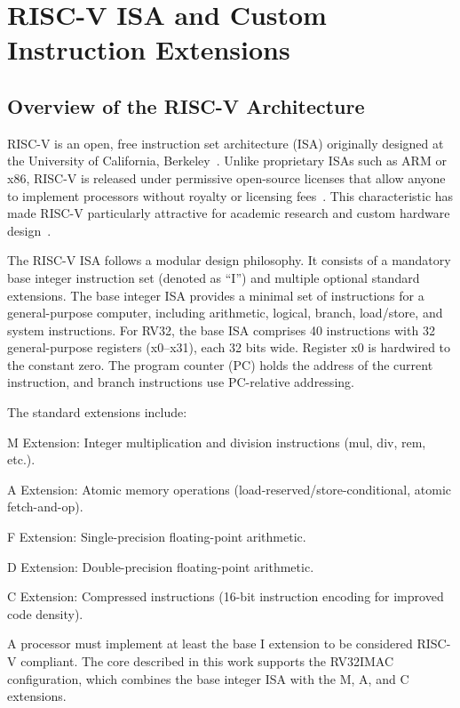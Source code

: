 

\section{RISC-V ISA and Custom Instruction Extensions}\label{sec:2_1}

\subsection{Overview of the RISC-V Architecture}

RISC-V is an open, free instruction set architecture (ISA) originally designed at the University of California, Berkeley~\cite{RISCV_UNPRIV_SPEC,WATERMAN_PHD,RISCV_PRIV_SPEC}. Unlike proprietary ISAs such as ARM or x86, RISC-V is released under permissive open-source licenses that allow anyone to implement processors without royalty or licensing fees~\cite{ASANOVIC_HOTCHIPS}. This characteristic has made RISC-V particularly attractive for academic research and custom hardware design~\cite{RISCV_READER}.


The RISC-V ISA follows a modular design philosophy. It consists of a mandatory base integer instruction set (denoted as “I”) and multiple optional standard extensions. The base integer ISA provides a minimal set of instructions for a general-purpose computer, including arithmetic, logical, branch, load/store, and system instructions. For RV32, the base ISA comprises 40 instructions with 32 general-purpose registers (x0–x31), each 32 bits wide. Register x0 is hardwired to the constant zero. The program counter (PC) holds the address of the current instruction, and branch instructions use PC-relative addressing.


The standard extensions include:


M Extension: Integer multiplication and division instructions (mul, div, rem, etc.).


A Extension: Atomic memory operations (load-reserved/store-conditional, atomic fetch-and-op).


F Extension: Single-precision floating-point arithmetic.


D Extension: Double-precision floating-point arithmetic.


C Extension: Compressed instructions (16-bit instruction encoding for improved code density).


A processor must implement at least the base I extension to be considered RISC-V compliant. The core described in this work supports the RV32IMAC configuration, which combines the base integer ISA with the M, A, and C extensions.


